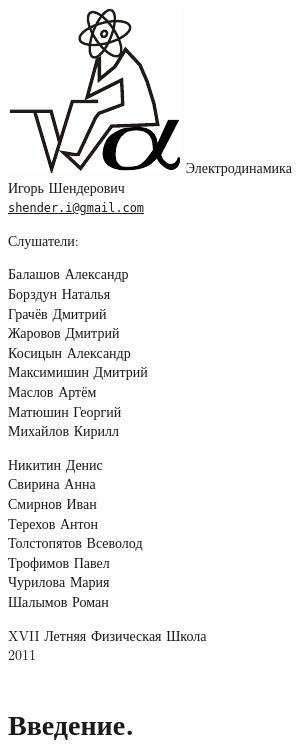 \documentclass[a4paper,12pt]{article}
\numberwithin{equation}{section}
\begin{document}
\thispagestyle{empty}
\begin{center}
  \includegraphics{logo}
  \vfill
  \LARGE{Электродинамика}\\[0.3cm]
  \Large{Игорь Шендерович}\\[0.3cm]
  {\large{\texttt{\href{mailto:shender.i@gmail.com}{shender.i@gmail.com}}}}\\[1cm]
  \large{Слушатели:\\[0.5cm]
    \hspace{2cm}\parbox[t]{0.4\textwidth}{
      Балашов Александр\\
      Борздун Наталья\\
      Грачёв Дмитрий\\
      Жаровов Дмитрий\\
      Косицын Александр\\
      Максимишин Дмитрий\\
      Маслов Артём\\
      Матюшин Георгий\\
      Михайлов Кирилл
      }\hspace{1cm}\parbox[t]{0.4\textwidth}{
       Никитин Денис\\
       Свирина Анна\\
       Смирнов Иван\\
       Терехов Антон\\
       Толстопятов Всеволод\\
       Трофимов Павел\\
       Чурилова Мария\\
       Шалымов Роман
      }
    }
  \vfill
  
  \normalsize{\textsf{XVII Летняя Физическая Школа\\
  2011}}
\end{center}

\clearpage


\section{Введение.}
\label{sec:intro}
\end{document}
